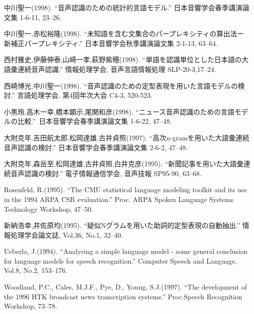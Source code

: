 \begin{thebibliography}{99}
    中川聖一(1998).
    ``音声認識のための統計的言語モデル.''
    日本音響学会春季講演論文集 1-6-11, 23--26.

    中川聖一,赤松裕隆(1998).
    ``未知語を含む文集合のパープレ\mbox{キシティの算出法ー新補正パープレ}キシティ.''
    日本音響学会秋季講演論文集 2-1-13, 63--64.

    西村雅史,伊藤伸泰,山崎一孝,萩野紫穂(1998).
    ``単語を認識単位とした日本語の\mbox{大語彙連続音声}認識.''
    情報処理学会, 音声言語情報処理 SLP-20-3,17--24.

    西崎博光,中川聖一(1998).
    ``音声認識のための定型表現を用いた言語モデルの検討.''
    言語処理学会, 第4回年次大会 C4-3, 520-523.
 
    小黒玲,高木一幸,橋本顕示,尾関和彦(1998).
    ``ニュース音声認識のための\mbox{言語モデルの比較.''
    日}本音響学会春季講演論文集 1-6-22, 47--48.

    大附克年,吉田航太郎,松岡達雄,古井貞照(1997).
    ``高次n-gramを用いた大語彙連続音声認識の検討.''
     日本音響学会春季講演論文集 2-6-2, 47--48.

    大附克年,森岳至,松岡達雄,古井貞照,白井克彦(1995).
    ``新聞記事を用いた大語彙連続音声認識の検討.''
    電子情報通信学会, 音声技報 SP95-90, 63--68.

    Rosenfeld, R.(1995).
    ``The CMU statistical language modeling toolkit and its use in the 1994 ARPA CSR evaluation.''
    Proc. ARPA Spoken Language Systems Technology Workshop, 47--50.


    新納浩幸,井佐原均(1995).
    ``疑似Nグラムを用いた助詞的定型表現の自動抽出.''
    情報処理学会論文誌, Vol.36, No.1, 32--40.

    Ueberla, J.(1994).
    ``Analysing a simple language model - some general conclusion for language models for speech recognition.''
    Computer Speech and Language, Vol.8, No.2, 153--176.

    Woodland, P.C., Cales, M.J.F., Pye, D., Young, S.J.(1997).
    ``The development of the 1996 HTK broadcast news transcription systems.''
    Proc.Speech Recognition Workshop, 73--78.

\end{thebibliography}
 


